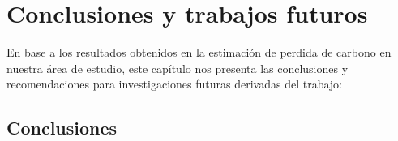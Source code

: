 \newpage{\ } 
\thispagestyle{empty} 

\chapter{Conclusiones y trabajos futuros}
En base a los resultados obtenidos en la estimaci\'on de perdida de carbono en nuestra \'area de estudio, este cap\'itulo nos presenta las conclusiones y recomendaciones para investigaciones futuras derivadas del trabajo:
\section{Conclusiones}

